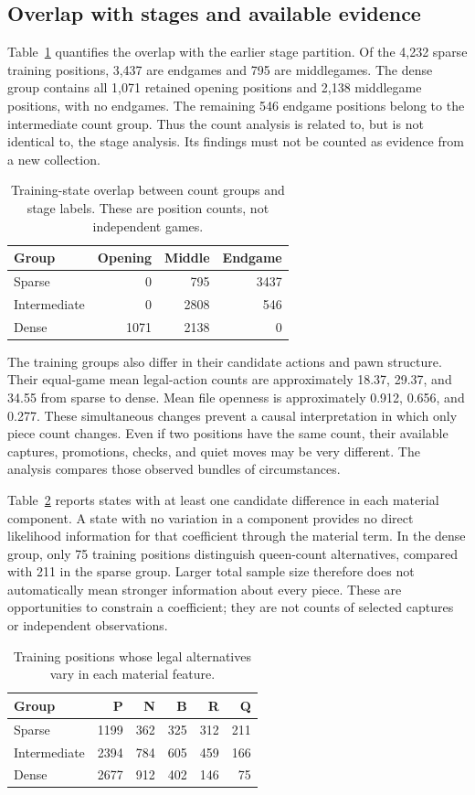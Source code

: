\subsection{Overlap with stages and available evidence}
Table~\ref{tab:countoverlap} quantifies the overlap with the earlier stage partition. Of the 4,232 sparse training positions, 3,437 are endgames and 795 are middlegames. The dense group contains all 1,071 retained opening positions and 2,138 middlegame positions, with no endgames. The remaining 546 endgame positions belong to the intermediate count group. Thus the count analysis is related to, but is not identical to, the stage analysis. Its findings must not be counted as evidence from a new collection.
\begin{table}[htbp]\centering
\small
\caption{Training-state overlap between count groups and stage labels. These are position counts, not independent games.}\label{tab:countoverlap}
\begin{tabular}{lrrr}
\toprule
Group & Opening & Middle & Endgame\\\midrule
Sparse & 0 & 795 & 3437\\
Intermediate & 0 & 2808 & 546\\
Dense & 1071 & 2138 & 0\\
\bottomrule\end{tabular}\end{table}

The training groups also differ in their candidate actions and pawn structure. Their equal-game mean legal-action counts are approximately 18.37, 29.37, and 34.55 from sparse to dense. Mean file openness is approximately 0.912, 0.656, and 0.277. These simultaneous changes prevent a causal interpretation in which only piece count changes. Even if two positions have the same count, their available captures, promotions, checks, and quiet moves may be very different. The analysis compares those observed bundles of circumstances.

Table~\ref{tab:countsupport} reports states with at least one candidate difference in each material component. A state with no variation in a component provides no direct likelihood information for that coefficient through the material term. In the dense group, only 75 training positions distinguish queen-count alternatives, compared with 211 in the sparse group. Larger total sample size therefore does not automatically mean stronger information about every piece. These are opportunities to constrain a coefficient; they are not counts of selected captures or independent observations.
\begin{table}[htbp]\centering
\small
\caption{Training positions whose legal alternatives vary in each material feature.}\label{tab:countsupport}
\begin{tabular}{lrrrrr}
\toprule
Group & P & N & B & R & Q\\\midrule
Sparse & 1199 & 362 & 325 & 312 & 211\\
Intermediate & 2394 & 784 & 605 & 459 & 166\\
Dense & 2677 & 912 & 402 & 146 & 75\\
\bottomrule\end{tabular}\end{table}


